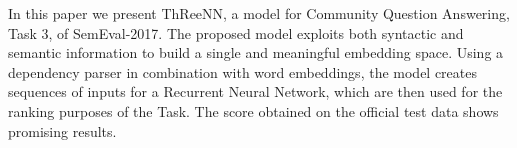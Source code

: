 In this paper we present ThReeNN, a model for Community Question Answering, Task 3, of SemEval-2017. The proposed model exploits both syntactic and semantic information to build a single and meaningful embedding space. Using a dependency parser in combination with word embeddings, the model creates sequences of inputs for a Recurrent Neural Network, which are then used for the ranking purposes of the Task. The score obtained on the official test data shows promising results.
